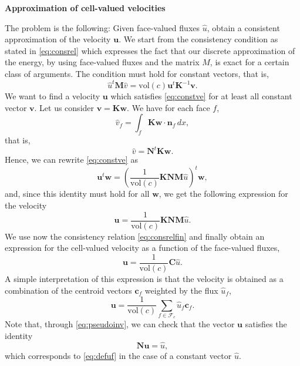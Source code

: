 \documentclass[11pt]{amsart}
\newcommand{\vect}[1]{\boldsymbol{#1}}
\newcommand{\mat}[1]{\boldsymbol{#1}}
\newcommand{\Fcal}{\mathcal{F}}
\begin{document}
\textbf{Approximation of cell-valued velocities}

The problem is the following: Given face-valued fluxes $\hat{u}$, obtain a consistent approximation
of the velocity $\vect{u}$. We start from the consistency condition as stated in \eqref{eq:consrel}
which expresses the fact that our discrete approximation of the energy, by using face-valued fluxes
and the matrix $M$, is exact for a certain class of arguments. The condition must hold for constant
vectors, that is,
\begin{equation}
  \label{eq:constve}
  \hat{u}^t\mat{M}\hat{v} = \text{vol}(c)\vect{u}^t\mat{K}^{-1}\vect{v}.
\end{equation}
We want to find a velocity $\vect{u}$ which satisfies \eqref{eq:constve} for at least all constant
vector $\vect{v}$. Let us consider $\vect{v} = \mat{K}\vect{w}$. We have for each face $f$,
\begin{equation*}
  \hat{v}_f = \int_f\mat{K}\vect{w}\cdot\vect{n}_f\,dx,
\end{equation*}
that is,
\begin{equation*}
  \hat{v} = \mat{N}^t\mat{K}\vect{w}.
\end{equation*}
Hence, we can rewrite \eqref{eq:constve} as
\begin{equation*}
  \vect{u}^t\vect{w} = \left(\frac{1}{\text{vol}(c)}\mat{K}\mat{N}\mat{M}\hat{u}\right)^t\vect{w},
\end{equation*}
and, since this identity must hold for all $\vect{w}$, we get the following expression for the
velocity
\begin{equation*}
  \vect{u} = \frac{1}{\text{vol}(c)} \mat{K}\mat{N}\mat{M}\hat{u}.
\end{equation*}
We use now the consistency relation \eqref{eq:consrelfin} and finally obtain an expression for the cell-valued
velocity as a function of the face-valued fluxes,
\begin{equation}
  \label{eq:velocapprox}
  \vect{u} = \frac{1}{\text{vol}(c)} \mat{C}\hat{u}.
\end{equation}
A simple interpretation of this expression is that the velocity is obtained as a combination of the
centroid vectors $\vect{c}_f$ weighted by the flux $\hat{u}_f$,
\begin{equation}
  \label{eq:simpleinterpvelapp}
  \vect{u} = \frac{1}{\text{vol}(c)} \sum_{f\in\Fcal_c}\hat{u}_f\vect{c}_f.
\end{equation}
Note that, through \eqref{eq:pseudoinv}, we can check that the vector $\vect{u}$ satisfies the
identity
\begin{equation*}
  \mat{N}\vect{u} = \hat{u},
\end{equation*}
which corresponds to \eqref{eq:defuf} in the case of a constant vector $\hat{u}$.


\printbibliography
\end{document}
